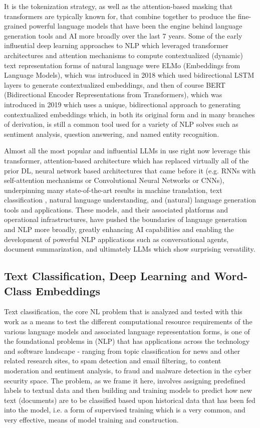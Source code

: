 \documentclass[final]{clv2025}
\begin{document}
It is the tokenization strategy, as well as the attention-based masking that transformers are typically known for, that combine together to produce the fine-grained powerful language models that have been the engine behind language generation tools and AI more broadly over the last 7 years. Some of the early influential deep learning approaches to NLP which leveraged transformer architectures and attention mechanisms to compute contextualized (dynamic) text representation forms of natural language were ELMo (Embeddings from Language Models), which was introduced in 2018 \cite{peters2018deep} which used bidirectional LSTM layers to generate contextualized embeddings, and then of course BERT (Bidirectional Encoder Representations from Transformers), which was introduced in 2019 \cite{devlin-etal-2019-bert} which uses a unique, bidirectional approach to generating contextualized embeddings which, in both its original form and in many branches of derivation, is still a common tool used for a variety of NLP solves such as sentiment analysis, question answering, and named entity recognition. 

Almost all the most popular and influential LLMs in use right now leverage this transformer, attention-based architecture which has replaced virtually all of the prior DL, neural network based architectures that came before it (e.g. RNNs with self-attention mechanisms or Convolutional Neural Networks or CNNs), underpinning many state-of-the-art results in machine translation, text classification \cite{devlin-etal-2019-bert}, natural language understanding, and (natural) language generation tools \cite{radford2019language} and applications. These models, and their associated platforms and operational infrastructures, have pushed the boundaries of language generation and NLP more broadly, greatly enhancing AI capabilities and enabling the development of powerful NLP applications such as conversational agents, document summarization, and ultimately LLMs which show surprising versatility.

\subsection{Text Classification, Deep Learning and Word-Class Embeddings}

Text classification, the core NL problem that is analyzed and tested with this work as a means to test the different computational resource requirements of the various language models and associated language representation forms, is one of the foundational problems in (NLP) that has applications across the technology and software landscape - ranging from topic classification for news and other related research sites, to spam detection and email filtering, to content moderation and sentiment analysis, to fraud and malware detection in the cyber security space. The problem, as we frame it here, involves assigning predefined labels to textual data and then building and training models to predict how new text (documents) are to be classified based upon historical data that has been fed into the model, i.e. a form of supervised training which is a very common, and very effective, means of model training and construction.
\end{document}
